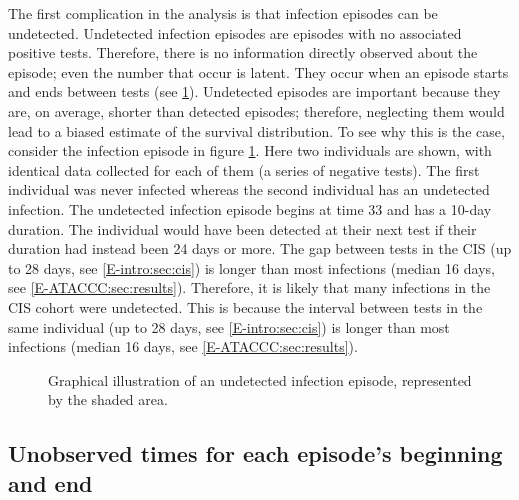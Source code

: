 \documentclass[thesis.tex]{subfiles}
\begin{document}
The first complication in the analysis is that infection episodes can be undetected.
Undetected infection episodes are episodes with no associated positive tests.
Therefore, there is no information directly observed about the episode; even the number that occur is latent.
They occur when an episode starts and ends between tests (see \cref{perf-test:fig:truncation}).
Undetected episodes are important because they are, on average, shorter than detected episodes; therefore, neglecting them would lead to a biased estimate of the survival distribution.
To see why this is the case, consider the infection episode in figure \cref{perf-test:fig:truncation}.
Here two individuals are shown, with identical data collected for each of them (a series of negative
tests).
The first individual was never infected whereas the second individual has an undetected infection. 
The undetected infection episode begins at time 33 and has a 10-day duration.
The individual would have been detected at their next test if their duration had instead been 24 days or more.
The gap between tests in the CIS (up to 28 days, see \cref{E-intro:sec:cis}) is longer than most infections (median 16 days, see \cref{E-ATACCC:sec:results}).
Therefore, it is likely that many infections in the CIS cohort were undetected.
This is because the interval between tests in the same individual (up to 28 days, see \cref{E-intro:sec:cis}) is longer than most infections (median 16 days, see \cref{E-ATACCC:sec:results}).
\begin{figure}
  \caption[Undetected episodes in CIS data]{Graphical illustration of an undetected infection episode, represented by the shaded area. \label{perf-test:fig:truncation}}
\end{figure}

\subsection{Unobserved times for each episode's beginning and end} \label{perf-test:sec:interval-censoring}
\end{document}
